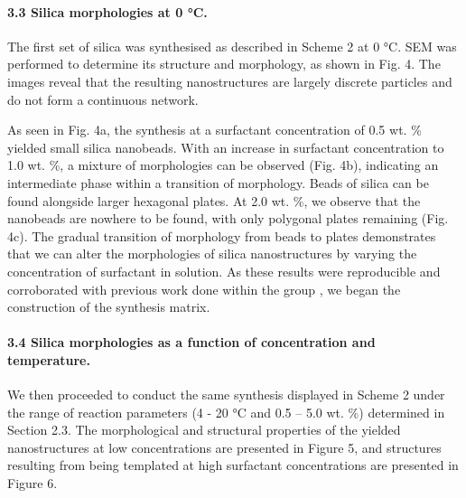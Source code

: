 \documentclass[a4paper,12pt,twocolumn]{article}
\begin{document}
	
  	
  	\paragraph{3.3 Silica morphologies at 0 °C.} The first set of silica was synthesised as described in Scheme 2 at 0 °C. SEM was performed to determine its structure and morphology, as shown in Fig. 4. The images reveal that the resulting nanostructures are largely discrete particles and do not form a continuous network.
  	
  	As seen in Fig. 4a, the synthesis at a surfactant concentration of 0.5 wt. \% yielded small silica nanobeads. With an increase in surfactant concentration to 1.0 wt. \%, a mixture of morphologies can be observed (Fig. 4b), indicating an intermediate phase within a transition of morphology. Beads of silica can be found alongside larger hexagonal plates. At 2.0 wt. \%, we observe that the nanobeads are nowhere to be found, with only polygonal plates remaining (Fig. 4c). The gradual transition of morphology from beads to plates demonstrates that we can alter the morphologies of silica nanostructures by varying the concentration of surfactant in solution. As these results were reproducible and corroborated with previous work done within the group \cite{yong2017}, we began the construction of the synthesis matrix.
  	
  	\paragraph{3.4 Silica morphologies as a function of concentration and temperature.} We then proceeded to conduct the same synthesis displayed in Scheme 2 under the range of reaction parameters (4 - 20 °C and 0.5 – 5.0 wt. \%) determined in Section 2.3. The morphological and structural properties of the yielded nanostructures at low concentrations are presented in Figure 5, and structures resulting from being templated at high surfactant concentrations are presented in Figure 6.
  	
\end{document}

